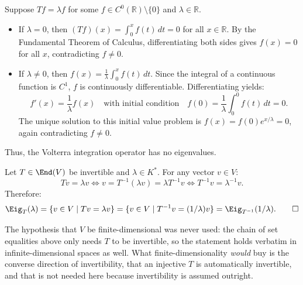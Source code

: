 \begin{exercisesolution}
\label{sol:volterra_integration_no_eigenvalues}
Suppose $T f = \lambda f$ for some $f \in C^0(\mathbb{R}) \setminus \{0\}$ and $\lambda \in \mathbb{R}$.
\begin{itemize}
    \item If $\lambda = 0$, then $(T f)(x) = \int_0^x f(t)\,dt = 0$ for all $x \in \mathbb{R}$.
    By the Fundamental Theorem of Calculus, differentiating both sides gives $f(x) = 0$ for all $x$, contradicting $f \ne 0$.
    \item If $\lambda \ne 0$, then $f(x) = \frac{1}{\lambda} \int_0^x f(t)\,dt$.
    Since the integral of a continuous function is $C^1$, $f$ is continuously differentiable. Differentiating yields:
    \[
    f'(x) = \frac{1}{\lambda} f(x) \quad \text{with initial condition} \quad f(0) = \frac{1}{\lambda}\int_0^0 f(t)\,dt = 0.
    \]
    The unique solution to this initial value problem is $f(x) = f(0) e^{x/\lambda} = 0$, again contradicting $f \ne 0$.
\end{itemize}
Thus, the Volterra integration operator has no eigenvalues.
\end{exercisesolution}

\begin{exercisesolution}
\label{sol:eigenspaces_inverse_endomorphism}
Let $T \in \End(V)$ be invertible and $\lambda \in K^*$.
For any vector $v \in V$:
\[
T v = \lambda v \iff v = T^{-1}(\lambda v) = \lambda T^{-1} v \iff T^{-1} v = \lambda^{-1} v.
\]
Therefore:
\[
\Eig_T(\lambda) = \{v \in V \mid Tv = \lambda v\} = \{v \in V \mid T^{-1} v = (1/\lambda) v\} = \Eig_{T^{-1}}(1/\lambda). \qedhere
\]
\begin{ainote}
The hypothesis that $V$ be finite-di\-men\-sional was never used: the chain of set equalities above only needs $T$ to be invertible, so the statement holds verbatim in infinite-di\-men\-sional spaces as well. What finite-dimensionality \emph{would} buy is the converse direction of invertibility, that an injective $T$ is automatically invertible, and that is not needed here because invertibility is assumed outright.
\end{ainote}
\end{exercisesolution}

